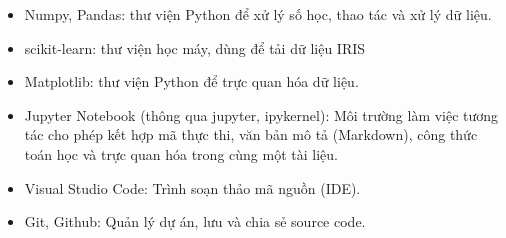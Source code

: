 \begin{itemize}
    \item Numpy, Pandas: thư viện Python để xử lý số học, thao tác và xử lý dữ liệu.
    \item scikit-learn: thư viện học máy, dùng để tải dữ liệu IRIS
    \item Matplotlib: thư viện Python để trực quan hóa dữ liệu.
    \item Jupyter Notebook (thông qua jupyter, ipykernel): Môi trường làm việc tương tác cho phép kết hợp mã thực thi, văn bản mô tả (Markdown), công thức toán học và trực quan hóa trong cùng một tài liệu.
    \item Visual Studio Code: Trình soạn thảo mã nguồn (IDE). 
    \item Git, Github: Quản lý dự án, lưu và chia sẻ source code.
\end{itemize}

\pagebreak
